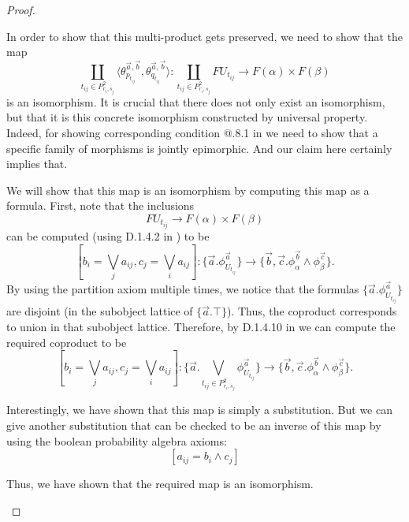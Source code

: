 \documentclass[a4paper]{amsproc}
\makeatletter
\theoremstyle{plain}
\theoremstyle{definition}
\theoremstyle{remark}
\numberwithin{equation}{section}
\newcommand{\Rmnum}[1]{\expandafter\@slowromancap\romannumeral #1@}
\makeatother
\begin{document}
\begin{proof}
\begin{enumerate}
        In order to show that this multi-product gets preserved, we need to show that the map
        \[
            \coprod_{t_{ij} \in P^2_{r_i,s_j}} \langle \theta^{\vec{a},\vec{b}}_{p_{t_{ij}}}, \theta^{\vec{a},\vec{b}}_{q_{t_{ij}}} \rangle : \coprod_{t_{ij} \in P^2_{r_i,s_j}} F U_{t_{ij}} \to F(\alpha) \times F(\beta)
        \]
        is an isomorphism. It is crucial that there does not only exist an isomorphism, but that it is this concrete isomorphism constructed by universal property. Indeed, for showing corresponding condition \Rmnum{7}.8.1 in \cite{maclane2012sheaves} we need to show that a specific family of morphisms is jointly epimorphic. And our claim here certainly implies that.

        We will show that this map is an isomorphism by computing this map as a formula. First, note that the inclusions
        \[
            FU_{t_{ij}} \to F(\alpha) \times F(\beta)
        \]
        can be computed (using D.1.4.2 in \cite{johnstone2002sketches2}) to be
        \[
            [ b_i = \bigvee_j a_{ij}, c_j = \bigvee_i a_{ij} ] :\{ \vec{a}. \phi^{\vec{a}}_{U_{t_{ij}}} \} \to \{ \vec{b},\vec{c} . \phi^{\vec{b}}_{\alpha} \wedge \phi^{\vec{c}}_{\beta} \} .
        \]
        By using the partition axiom multiple times, we notice that the formulas $\{ \vec{a} . \phi^{\vec{a}}_{U_{t_{ij}}}\}$ are disjoint (in the subobject lattice of $\{ \vec{a} . \top \}$). Thus, the coproduct corresponds to union in that subobject lattice. Therefore, by D.1.4.10 in \cite{johnstone2002sketches2} we can compute the required coproduct to be
        \[
            [ b_i = \bigvee_j a_{ij}, c_j = \bigvee_i a_{ij} ]: \{ \vec{a}.\bigvee_{t_{ij} \in P^2_{r_i,s_j} } \phi^{\vec{a}}_{U_{t_{ij}}} \} \to \{\vec{b},\vec{c} . \phi^{\vec{b}}_{\alpha} \wedge \phi^{\vec{c}}_{\beta}\}.
        \]

        Interestingly, we have shown that this map is simply a substitution. But we can give another substitution that can be checked to be an inverse of this map by using the boolean probability algebra axioms:
        \[
            [a_{ij} = b_i \wedge c_j]
        \]

        Thus, we have shown that the required map is an isomorphism.


\end{enumerate}
\end{proof}
\end{document}
